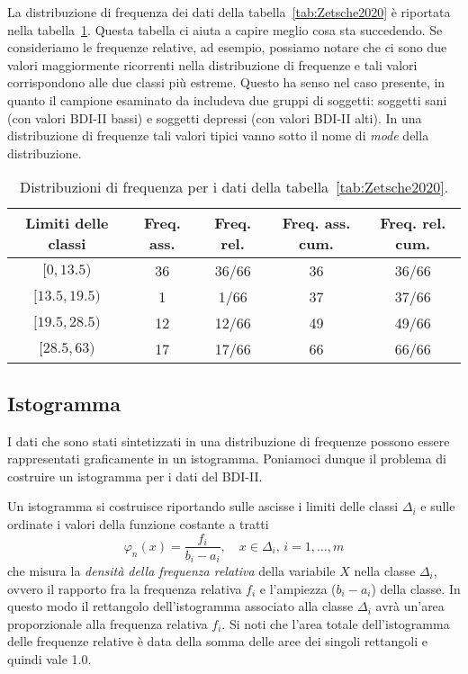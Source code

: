 La distribuzione di frequenza dei dati della tabella~\ref{tab:Zetsche2020} è riportata nella tabella~\ref{tab:Zetsche2020_freq}.
Questa tabella ci aiuta a capire meglio cosa sta succedendo.
Se consideriamo le frequenze relative, ad esempio, possiamo notare che ci sono due valori maggiormente ricorrenti nella distribuzione di frequenze e tali valori corrispondono alle due classi più estreme.
Questo ha senso nel caso presente, in quanto il campione esaminato da \citet{zetsche_future_2019} includeva due gruppi di soggetti: soggetti sani (con valori BDI-II bassi) e soggetti depressi (con valori BDI-II alti).
In una distribuzione di frequenze tali valori tipici vanno sotto il nome di \emph{mode} della distribuzione.

\begin{table}
\caption{Distribuzioni di frequenza per i dati della tabella~\ref{tab:Zetsche2020}.}
\centering
\begin{tabular}{ccccc}
\hline
Limiti delle classi & Freq. ass. & Freq. rel. & Freq. ass. cum. & Freq. rel. cum.\\
\hline
$[0, 13.5)$  & 36 & 36/66 &  36 &  36/66\\
$[13.5, 19.5)$ & 1  & 1/66  &  37 &  37/66\\
$[19.5, 28.5)$ & 12 & 12/66 &  49 &  49/66\\
$[28.5, 63)$ & 17 & 17/66 &  66 &  66/66\\
\hline
\end{tabular}
\label{tab:Zetsche2020_freq}
\end{table}


\subsection{Istogramma}

I dati che sono stati sintetizzati in una distribuzione di frequenze possono essere rappresentati graficamente in un istogramma. 
Poniamoci dunque il problema di costruire un istogramma per i dati del BDI-II.

Un istogramma si costruisce riportando sulle ascisse i limiti delle classi $\Delta_i$ e sulle ordinate i valori della funzione costante a tratti
\begin{equation}
\varphi_n(x)= \frac{f_i}{b_i-a_i}, \quad x\in \Delta_i,\, i=1, \dots, m
\end{equation}
che misura la \emph{densità della frequenza relativa} della variabile $X$ nella classe $\Delta_i$, ovvero il rapporto fra la frequenza relativa $f_i$ e l'ampiezza ($b_i - a_i$) della classe. 
In questo modo il rettangolo dell'istogramma associato alla classe $\Delta_i$ avrà un'area proporzionale alla frequenza relativa $f_i$. 
Si noti che l'area totale dell'istogramma delle frequenze relative è data della somma delle aree dei singoli rettangoli e quindi vale 1.0. 

